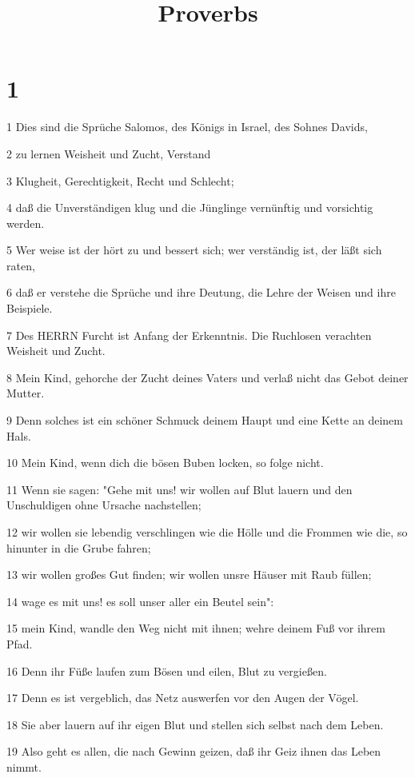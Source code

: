 

\title{Proverbs}


\chapter{1}

\par 1 Dies sind die Sprüche Salomos, des Königs in Israel, des Sohnes Davids,
\par 2 zu lernen Weisheit und Zucht, Verstand
\par 3 Klugheit, Gerechtigkeit, Recht und Schlecht;
\par 4 daß die Unverständigen klug und die Jünglinge vernünftig und vorsichtig werden.
\par 5 Wer weise ist der hört zu und bessert sich; wer verständig ist, der läßt sich raten,
\par 6 daß er verstehe die Sprüche und ihre Deutung, die Lehre der Weisen und ihre Beispiele.
\par 7 Des HERRN Furcht ist Anfang der Erkenntnis. Die Ruchlosen verachten Weisheit und Zucht.
\par 8 Mein Kind, gehorche der Zucht deines Vaters und verlaß nicht das Gebot deiner Mutter.
\par 9 Denn solches ist ein schöner Schmuck deinem Haupt und eine Kette an deinem Hals.
\par 10 Mein Kind, wenn dich die bösen Buben locken, so folge nicht.
\par 11 Wenn sie sagen: "Gehe mit uns! wir wollen auf Blut lauern und den Unschuldigen ohne Ursache nachstellen;
\par 12 wir wollen sie lebendig verschlingen wie die Hölle und die Frommen wie die, so hinunter in die Grube fahren;
\par 13 wir wollen großes Gut finden; wir wollen unsre Häuser mit Raub füllen;
\par 14 wage es mit uns! es soll unser aller ein Beutel sein":
\par 15 mein Kind, wandle den Weg nicht mit ihnen; wehre deinem Fuß vor ihrem Pfad.
\par 16 Denn ihr Füße laufen zum Bösen und eilen, Blut zu vergießen.
\par 17 Denn es ist vergeblich, das Netz auswerfen vor den Augen der Vögel.
\par 18 Sie aber lauern auf ihr eigen Blut und stellen sich selbst nach dem Leben.
\par 19 Also geht es allen, die nach Gewinn geizen, daß ihr Geiz ihnen das Leben nimmt.
